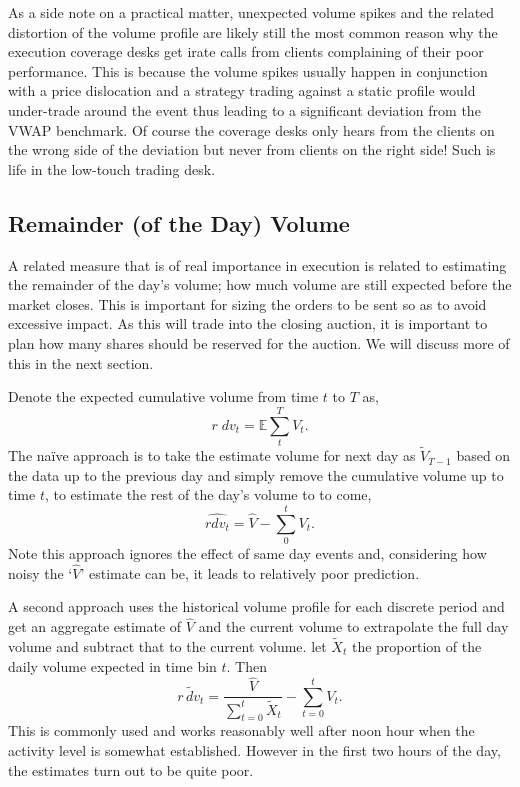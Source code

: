 As a side note on a practical matter, unexpected volume spikes and the related distortion of the volume profile are likely still the most common reason why the execution coverage desks get irate calls from clients complaining of their poor performance. This is because the volume spikes usually happen in conjunction with a price dislocation and a strategy trading against a static profile would under-trade around the event thus leading to a significant deviation from the VWAP benchmark. Of course the coverage desks only hears from the clients on the wrong side of the deviation but never from clients on the right side! Such is life in the low-touch trading desk. 



\subsection{Remainder (of the Day) Volume}

A related measure that is of real importance in execution is related to estimating the remainder of the day's volume; how much volume are still expected before the market closes. This is important for sizing the orders to be sent so as to avoid excessive impact. As this will trade into the closing auction, it is important to plan how many shares should be reserved for the auction. We will discuss more of this in the next section.


Denote the expected cumulative volume from time $t$ to $T$ as,
	\begin{equation} \label{eq:rdv_1}
		r \;dv_t = \mathbb{E} \sum_t^T V_t.
	\end{equation}
The na\"ive approach is to take the estimate volume for next day as $\tilde{V}_{T-1}$  based on the data up to the previous day and simply remove the cumulative volume up to time $t$, to estimate the rest of the day's volume to to come,
	\begin{equation}\label{eq:rdv_2}
		\widehat{rdv_t}=  \hat{V} - \sum_0^t V_t.
	\end{equation}
Note this approach ignores the effect of same day events and, considering how noisy the `$\hat{V}$' estimate can be, it leads to relatively poor prediction.


A second approach uses the historical volume profile for each discrete period and get an aggregate estimate of $\hat{V}$ and the current volume to extrapolate the full day volume and subtract that to the current volume. let $\tilde{X}_t$ the proportion of the daily volume expected in time bin $t$. Then
	\begin{equation}\label{eq:rdv_3}
		\widetilde{r\,dv_t}= \dfrac{\hat{V}}{\sum_{t=0}^t \tilde{X}_t} - \sum_{t=0}^t V_t.
	\end{equation}
This is commonly used and works reasonably well after noon hour when the activity level is somewhat established. However in the first two hours of the day, the estimates turn out to be quite poor.


